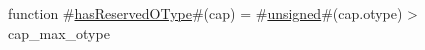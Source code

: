 function #\hyperref[sailRISCVzhasReservedOType]{hasReservedOType}#(cap) = #\hyperref[sailRISCVzunsigned]{unsigned}#(cap.otype) > cap_max_otype
